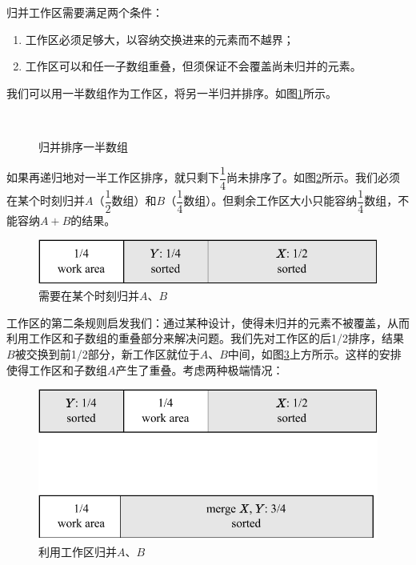 \documentclass[b5paper]{ctexart}
\begin{document}
归并工作区需要满足两个条件：

\begin{enumerate}
\item 工作区必须足够大，以容纳交换进来的元素而不越界；
\item 工作区可以和任一子数组重叠，但须保证不会覆盖尚未归并的元素。
\end{enumerate}

我们可以用一半数组作为工作区，将另一半归并排序。如图\ref{fig:merge-in-place-start}所示。

\begin{figure}[htbp]
 \centering
       \\
 \caption{归并排序一半数组}
 \label{fig:merge-in-place-start}
\end{figure}

如果再递归地对一半工作区排序，就只剩下$\dfrac{1}{4}$尚未排序了。如图\ref{fig:merge-in-place-quater}所示。我们必须在某个时刻归并$A$（$\dfrac{1}{2}$数组）和$B$（$\dfrac{1}{4}$数组）。但剩余工作区大小只能容纳$\dfrac{1}{4}$数组，不能容纳$A + B$的结果。

\begin{figure}[htbp]
 \centering
 \includegraphics[scale=0.8]{img/workarea-1}
 \caption{需要在某个时刻归并$A$、$B$}
 \label{fig:merge-in-place-quater}
\end{figure}

工作区的第二条规则启发我们：通过某种设计，使得未归并的元素不被覆盖，从而利用工作区和子数组的重叠部分来解决问题。我们先对工作区的后1/2排序，结果$B$被交换到前1/2部分，新工作区就位于$A$、$B$中间，如图\ref{fig:merge-in-place-setup}上方所示。这样的安排使得工作区和子数组$A$产生了重叠\cite{msort-in-place}。考虑两种极端情况：

\begin{figure}[htbp]
 \centering
 \includegraphics[scale=0.8]{img/workarea-2}
 \caption{利用工作区归并$A$、$B$}
 \label{fig:merge-in-place-setup}
\end{figure}
\end{document}
